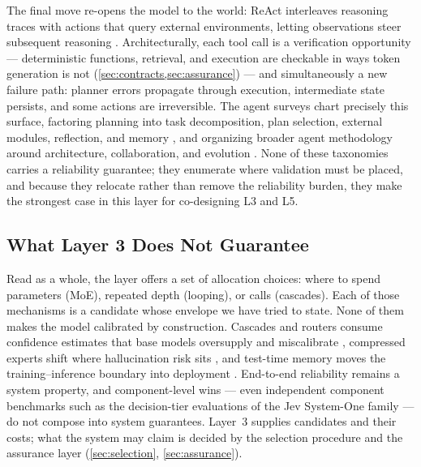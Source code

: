 The final move re-opens the model to the world: ReAct interleaves reasoning traces with actions that query external environments, letting observations steer subsequent reasoning \cite{id221003629}. Architecturally, each tool call is a verification opportunity --- deterministic functions, retrieval, and execution are checkable in ways token generation is not (\cref{sec:contracts,sec:assurance}) --- and simultaneously a new failure path: planner errors propagate through execution, intermediate state persists, and some actions are irreversible. The agent surveys chart precisely this surface, factoring planning into task decomposition, plan selection, external modules, reflection, and memory \cite{id240202716}, and organizing broader agent methodology around architecture, collaboration, and evolution \cite{id250321460}. None of these taxonomies carries a reliability guarantee; they enumerate where validation must be placed, and because they relocate rather than remove the reliability burden, they make the strongest case in this layer for co-designing L3 and L5.

\subsection{What Layer 3 Does Not Guarantee}
\label{sec:l3-envelope}

Read as a whole, the layer offers a set of allocation choices: where to spend parameters (MoE), repeated depth (looping), or calls (cascades). Each of those mechanisms is a candidate whose envelope we have tried to state. None of them makes the model calibrated by construction. Cascades and routers consume confidence estimates that base models oversupply and miscalibrate \cite{id240215991}, compressed experts shift where hallucination risk sits \cite{id260701444}, and test-time memory moves the training--inference boundary into deployment \cite{id250519475}. End-to-end reliability remains a system property, and component-level wins --- even independent component benchmarks such as the decision-tier evaluations of the Jev System-One family \cite{rauk2026jevbenchmark} --- do not compose into system guarantees. Layer~3 supplies candidates and their costs; what the system may claim is decided by the selection procedure and the assurance layer (\cref{sec:selection}, \cref{sec:assurance}).
